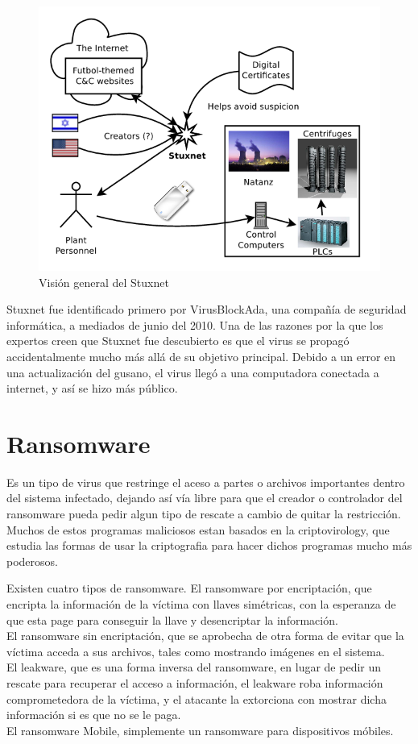 \documentclass[a4paper,12pt]{article}
\begin{document}
\begin{figure}
 \centering
 \includegraphics[scale=0.5]{stux.png}
 \caption{Visión general del Stuxnet \cite{stux}}
 \label{fig:stux}
\end{figure}

Stuxnet fue identificado primero por VirusBlockAda, una compañía de seguridad informática, a mediados de junio del 2010.
Una de las razones por la que los expertos creen que Stuxnet fue descubierto es que el virus se propagó accidentalmente mucho
más allá de su objetivo principal. Debido a un error en una actualización del gusano, el virus llegó a una computadora conectada
a internet, y así se hizo más público.

\section{Ransomware}

Es un tipo de virus que restringe el aceso a partes o archivos importantes dentro del sistema infectado, dejando así vía libre
para que el creador o controlador del ransomware pueda pedir algun tipo de rescate a cambio de quitar la restricción. Muchos
de estos programas maliciosos estan basados en la criptovirology, que estudia las formas de usar la criptografia para hacer dichos
programas mucho más poderosos. \cite{ran} \par

Existen cuatro tipos de ransomware. El ransomware por encriptación, que encripta la información de la víctima con llaves simétricas,
con la esperanza de que esta page para conseguir la llave y desencriptar la información. \\
El ransomware sin encriptación, que se aprobecha de otra forma de evitar que la víctima acceda a sus archivos, tales como mostrando
imágenes en el sistema.\\
El leakware, que es una forma inversa del ransomware, en lugar de pedir un rescate para recuperar el acceso a información,
el leakware roba información comprometedora de la víctima, y el atacante la extorciona con mostrar dicha información si es que
no se le paga.\\
El ransomware Mobile, simplemente un ransomware para dispositivos móbiles. \par
\end{document}
